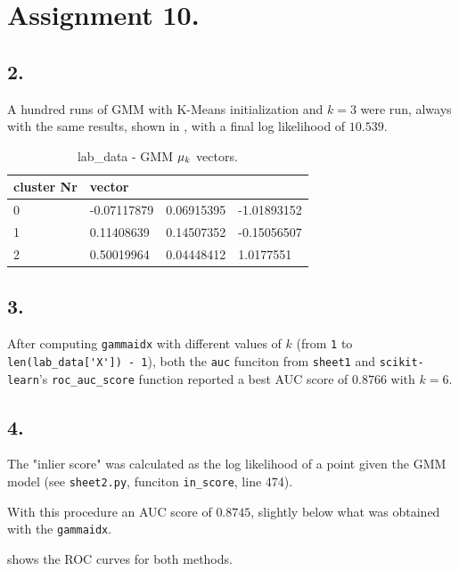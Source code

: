 \documentclass[a4paper,11pt]{article}
\begin{document}
\section*{Assignment 10.}
\subsection*{2.}
A hundred runs of GMM with K-Means initialization and $k=3$ were run, always with the same results, shown in , with a final log likelihood of $10.539$.
\begin{table}
    \centering
    \begin{tabularx}{\textwidth}{X|XXX}
        cluster Nr &  vector     &            & \\
        \hline
        0          & -0.07117879 & 0.06915395 & -1.01893152 \\
        \hline
        1          &  0.11408639 & 0.14507352 & -0.15056507 \\
        \hline
        2          &  0.50019964 & 0.04448412 &  1.0177551 \\
        \hline
    \end{tabularx}
    \caption{\small{lab\_data - GMM $\protect\mu_k$ vectors.}}
    \label{tab:assignment10}
\end{table}
\subsection*{3.}

After computing \verb|gammaidx| with different values of $k$ (from \verb|1| to \verb|len(lab_data['X']) - 1|), both the \verb|auc| funciton from \verb|sheet1| and \verb|scikit-learn|'s \verb|roc_auc_score| function reported a best AUC score of $0.8766$ with $k=6$.

\subsection*{4.}
The "inlier score" was calculated as the log likelihood of a point given the GMM model (see \verb|sheet2.py|, funciton \verb|in_score|, line 474).

With this procedure an AUC score of $0.8745$, slightly below what was obtained with the \verb|gammaidx|.

 shows the ROC curves for both methods.
\end{document}
